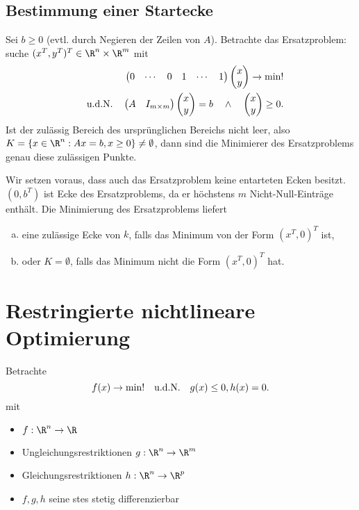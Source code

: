 \subsection{Bestimmung einer Startecke}

Sei \oBdA $b \ge 0$ (evtl. durch Negieren der Zeilen von $A$).
Betrachte das Ersatzproblem:
suche $(x^T,y^T)^T \in \R^n \times \R^m$ mit
\begin{align*}
	\begin{pmatrix}
		0 & \cdots & 0 & 1 & \cdots & 1
	\end{pmatrix}
	\begin{pmatrix}
		x \\ y
	\end{pmatrix}
	\to \min! \\
	\quad\text{u.d.N.}\quad
	\begin{pmatrix}
		A & I_{m\times m}
	\end{pmatrix}
	\begin{pmatrix}
		x \\ y
	\end{pmatrix}
	= b
	\quad \land \quad
	\begin{pmatrix}
		x \\ y
	\end{pmatrix}
	\ge 0.
\end{align*}
Ist der zulässig Bereich des ursprünglichen Bereichs nicht leer, also $K = \{x \in \R^n : Ax = b, x \ge 0 \} \neq \emptyset$, dann sind die Minimierer des Ersatzproblems genau diese zulässigen Punkte.

Wir setzen voraus, dass auch das Ersatzproblem keine entarteten Ecken besitzt.
$(0, b^T)$ ist Ecke des Ersatzproblems, da er höchstens $m$ Nicht-Null-Einträge enthält.
Die Minimierung des Ersatzproblems liefert
\begin{enumerate}[(a)]
	\item
		eine zulässige Ecke von $k$, falls das Minimum von der Form $(x^T, 0)^T$ ist,
	\item
		oder $K = \emptyset$, falls das Minimum nicht die Form $(x^T, 0)^T$ hat.
\end{enumerate}


\section{Restringierte nichtlineare Optimierung}


Betrachte
\[
	f(x) \to \min! \quad\text{u.d.N.}\quad g(x) \le 0, h(x) = 0.
\]
mit
\begin{itemize}
	\item
		$f: \R^n \to \R$
	\item
		Ungleichungsrestriktionen $g: \R^n \to \R^m$
	\item
		Gleichungsrestriktionen $h: \R^n \to \R^p$
	\item
		$f,g,h$ seine stes stetig differenzierbar
\end{itemize}

